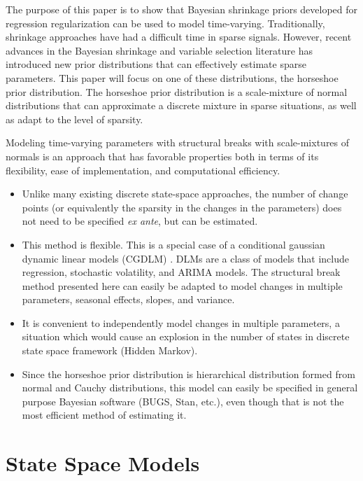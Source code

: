 \documentclass{article}
\begin{document}
The purpose of this paper is to show that Bayesian shrinkage priors developed for regression regularization can be used to model time-varying.
Traditionally, shrinkage approaches have had a difficult time in sparse signals.
However, recent advances in the Bayesian shrinkage and variable selection literature has introduced new prior distributions that can effectively estimate sparse parameters. 
This paper will focus on one of these distributions, the horseshoe prior distribution.
The horseshoe prior distribution is a scale-mixture of normal distributions that can approximate a discrete mixture in sparse situations, as well as adapt to the level of sparsity.

Modeling time-varying parameters with structural breaks with scale-mixtures of normals is an approach that has favorable properties both in terms of its flexibility, ease of implementation, and computational efficiency.
\begin{itemize}
\item Unlike many existing discrete state-space approaches, the number of change points (or equivalently the sparsity in the changes in the parameters) does not need to be specified \textit{ex ante}, but can be estimated.
\item This method is flexible.
  This is a special case of a conditional gaussian dynamic linear models (CGDLM) \parencites{WestHarrison1997}{DurbinKoopman2012}{CommandeurKoopman2007}{ShumwayStoffer2010}.
  DLMs are a class of models that include regression, stochastic volatility, and ARIMA models.
  The structural break method presented here can easily be adapted to model changes in multiple parameters, seasonal effects, slopes, and variance.
\item It is convenient to independently model changes in multiple parameters, a situation which would cause an explosion in the number of states in discrete state space framework (Hidden Markov).
\item Since the horseshoe prior distribution is hierarchical distribution formed from normal and Cauchy distributions, this model can easily be specified in general purpose Bayesian software (BUGS, Stan, etc.), even though that is not the most efficient method of estimating it.
\end{itemize}

\section{State Space Models}
\end{document}
